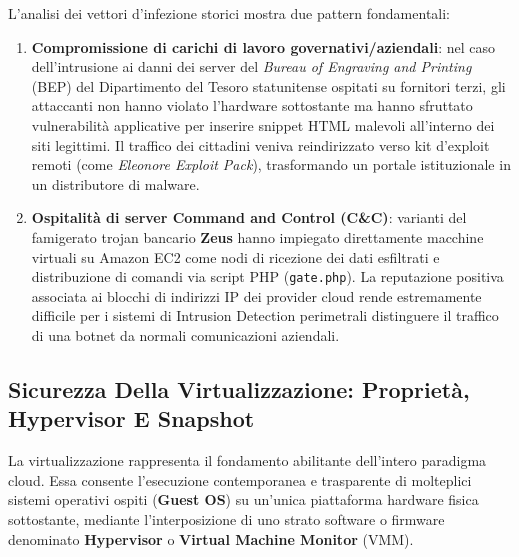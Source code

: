 \documentclass[11pt, a4paper]{article}
\begin{document}

L'analisi dei vettori d'infezione storici mostra due pattern fondamentali:
\begin{enumerate}
    \item \textbf{Compromissione di carichi di lavoro governativi/aziendali}: nel caso dell'intrusione ai danni dei server del \emph{Bureau of Engraving and Printing} (BEP) del Dipartimento del Tesoro statunitense ospitati su fornitori terzi, gli attaccanti non hanno violato l'hardware sottostante ma hanno sfruttato vulnerabilità applicative per inserire snippet HTML malevoli all'interno dei siti legittimi. Il traffico dei cittadini veniva reindirizzato verso kit d'exploit remoti (come \emph{Eleonore Exploit Pack}), trasformando un portale istituzionale in un distributore di malware.
    \item \textbf{Ospitalità di server Command and Control (C\&C)}: varianti del famigerato trojan bancario \textbf{Zeus} hanno impiegato direttamente macchine virtuali su Amazon EC2 come nodi di ricezione dei dati esfiltrati e distribuzione di comandi via script PHP (\texttt{gate.php}). La reputazione positiva associata ai blocchi di indirizzi IP dei provider cloud rende estremamente difficile per i sistemi di Intrusion Detection perimetrali distinguere il traffico di una botnet da normali comunicazioni aziendali.
\end{enumerate}

\subsection{Sicurezza Della Virtualizzazione: Proprietà, Hypervisor E Snapshot}

La virtualizzazione rappresenta il fondamento abilitante dell'intero paradigma cloud. Essa consente l'esecuzione contemporanea e trasparente di molteplici sistemi operativi ospiti (\textbf{Guest OS}) su un'unica piattaforma hardware fisica sottostante, mediante l'interposizione di uno strato software o firmware denominato \textbf{Hypervisor} o \textbf{Virtual Machine Monitor} (VMM).

\end{document}

